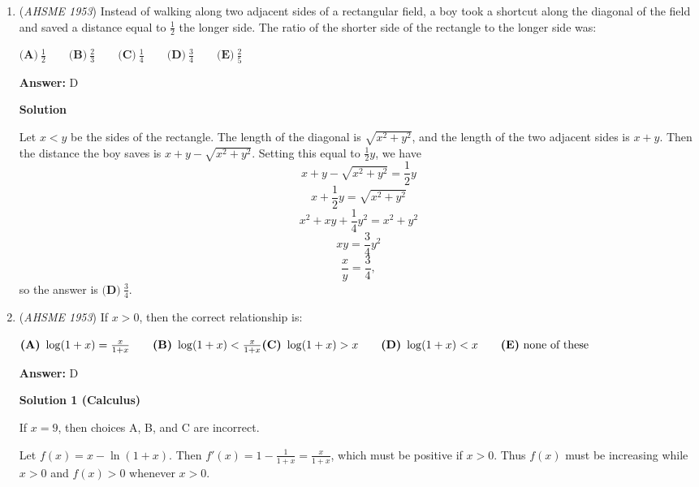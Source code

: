 \begin{enumerate}
\textbf{Solution}

Since $a$ and $b$ are positive, the \href{https://artofproblemsolving.com/wiki/index.php?title=AM-GM\_Inequality}{AM-GM Inequality}, that is, $\boxed{\textbf{(E)}\ \frac{a+b}{2}\geq\sqrt{ab}}$, holds.

 Choice A is false if $a = b$.  Choice B is always false.  Choices C and D are false if $a \neq b$.

 


	\item (\textit{AHSME 1953}) Instead of walking along two adjacent sides of a rectangular field, a boy took a shortcut along the diagonal of the field and 
saved a distance equal to $\frac{1}{2}$ the longer side. The ratio of the shorter side of the rectangle to the longer side was: 


 $\textbf{(A)}\ \frac{1}{2} \qquad \textbf{(B)}\ \frac{2}{3} \qquad \textbf{(C)}\ \frac{1}{4} \qquad \textbf{(D)}\ \frac{3}{4}\qquad \textbf{(E)}\ \frac{2}{5}$

 \textbf{Answer: }D



\textbf{Solution}

Let $x<y$ be the sides of the rectangle. The length of the diagonal is $\sqrt{x^2+y^2}$, and the length of the two adjacent sides is $x+y$. Then the distance the boy saves is $x+y-\sqrt{x^2+y^2}$. Setting this equal to $\frac12y$, we have
 \[x+y-\sqrt{x^2+y^2}=\frac12y\]
 \[x+\frac12y=\sqrt{x^2+y^2}\]
 \[x^2+xy+\frac14y^2=x^2+y^2\]
 \[xy=\frac34y^2\]
 \[\frac xy=\frac34,\]so the answer is $\boxed{\textbf{(D)}\ \frac{3}{4}}$.

 


	\item (\textit{AHSME 1953}) If $x>0$, then the correct relationship is: 


 $\textbf{(A)}\ \log (1+x) = \frac{x}{1+x} \qquad \textbf{(B)}\ \log (1+x) < \frac{x}{1+x} \\  \textbf{(C)}\ \log(1+x) > x\qquad \textbf{(D)}\ \log (1+x) < x\qquad \textbf{(E)}\ \text{none of these}$

 \textbf{Answer: }D



\textbf{Solution 1 (Calculus)}

If $x=9$, then choices A, B, and C are incorrect.  

 Let $f(x) = x - \ln(1+x)$.  Then $f'(x) = 1 - \frac{1}{1+x} = \frac{x}{1+x}$, which must be positive if $x > 0$.  Thus $f(x)$ must be increasing while $x > 0$ and $f(x) > 0$ whenever $x > 0$.


\end{enumerate}

